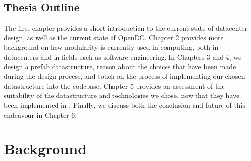 \documentclass[11pt]{article}
\begin{document}
	\subsection{Thesis Outline}
		The first chapter provides a short introduction to the current state of datacenter design, as well as the current state of OpenDC. 
		Chapter 2 provides more background on how modularity is currently used in computing, both in datacenters and in fields such as software engineering. 
		In Chapters 3 and 4, we design a prefab datastructure, reason about the choices that have been made during the design process, and touch on the process of implementing our chosen datastructure into the \opendc{} codebase.
		Chapter 5 provides an assessment of the suitability of the datastructure and technologies we chose, now that they have been implemented in \opendc{}.
		Finally, we discuss both the conclusion and future of this endeavour in Chapter 6.
	

	

\newpage

\section{Background} \label{sec:background}
\end{document}
